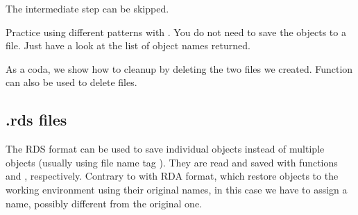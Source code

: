 \documentclass[krantz2]{krantz}\usepackage{knitr}%
\begin{document}
The intermediate step can be skipped.

\begin{knitrout}\footnotesize
{}\color{fgcolor}\begin{kframe}
\begin{alltt}
\hlstd{(} \hlstd{=} \hlstd{(} \hlstd{=} \hlstd{),}  \hlstd{=} \hlstd{)}
\end{alltt}
\end{kframe}
\end{knitrout}

\begin{playground}
Practice using different patterns with . You do not need to save the objects to a file. Just have a look at the list of object names returned.
\end{playground}

As a coda, we show how to cleanup by deleting the two files we created. Function  can also be used to delete files.

\begin{knitrout}\footnotesize
{}\color{fgcolor}\begin{kframe}
\begin{alltt}
\hlstd{(}\hlstd{(}\hlstd{,} \hlstd{))}
\end{alltt}
\end{kframe}
\end{knitrout}

\subsection{.rds files}\label{sec:data:rds}

The RDS format can be used to save individual objects instead of multiple objects (usually using file name tag ). They are read and saved with functions  and , respectively. Contrary to with RDA format, which restore objects to the working environment using their original names, in this case we have to assign a name, possibly different from the original one.

\begin{knitrout}\footnotesize
{}\color{fgcolor}\begin{kframe}
\begin{alltt}
 \hlstd{)}
\end{alltt}
\end{kframe}
\end{knitrout}
\end{document}
